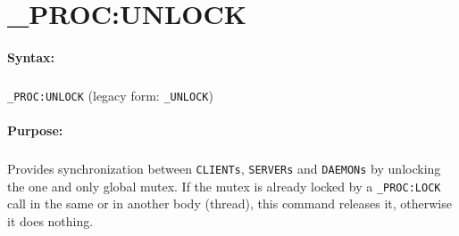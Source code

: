 
\newpage
\section{\_PROC:UNLOCK}
\label{cmd:_PROC:UNLOCK}

\paragraph{Syntax:}
\subparagraph{}
\texttt{\_PROC:UNLOCK} (legacy form: \texttt{\_UNLOCK})

\paragraph{Purpose:}
\subparagraph{}
Provides synchronization between \texttt{CLIENTs}, \texttt{SERVERs}
and \texttt{DAEMONs} by unlocking the one and only global mutex.
If the mutex is already locked by a \texttt{\_PROC:LOCK} call in the same
or in another body (thread), this command releases it, otherwise it
does nothing.

